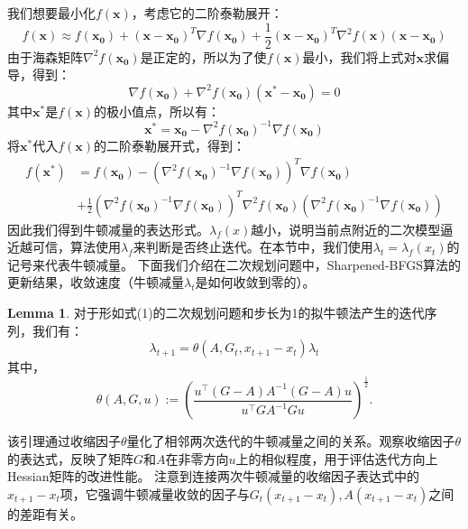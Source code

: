 \documentclass[a4paper,twoside,AutoFakeBold]{article}
\theoremstyle{definition}
\newtheorem{lema2}{{Lemma}}
\begin{document}
我们想要最小化$f(\bm{x})$，考虑它的二阶泰勒展开：
\begin{equation}
    f(\bm{x})\approx f(\bm{x_0})+(\bm{x}-\bm{x_0})^T\nabla f(\bm{x_0})+\frac{1}{2}(\bm{x}-\bm{x_0})^T\nabla^2 f(\bm{x})(\bm{x}-\bm{x_0})
\end{equation}
由于海森矩阵$\nabla^2 f(\bm{x_0})$是正定的，所以为了使$f(\bm{x})$最小，我们将上式对$\bm{x}$求偏导，得到：
\begin{equation}
        \nabla f(\bm{x_0})+\nabla ^2 f(\bm{x_0})(\bm{x^{*}}-\bm{x_0})=0
\end{equation}
其中$\bm{x^{*}}$是$f(\bm{x})$的极小值点，所以有：
\begin{equation}
    \bm{x^{*}}=\bm{x_0}-\nabla ^2 f(\bm{x_0})^{-1}\nabla f(\bm{x_0})
\end{equation}
将$\bm{x^{*}}$代入$f(\bm{x})$的二阶泰勒展开式，得到：
\begin{equation}
    \begin{aligned}
    f(\bm{x^{*}})&=f(\bm{x_0})-(\nabla^2f(\bm{x_0})^{-1}\nabla f(\bm{x_0}))^T\nabla f(\bm{x_0})\\
    &+\frac{1}{2}(\nabla^2f(\bm{x_0})^{-1}\nabla f(\bm{x_0}))^T\nabla^2f(\bm{x_0})(\nabla^2f(\bm{x_0})^{-1}\nabla f(\bm{x_0}))
    \end{aligned}
\end{equation}
因此我们得到牛顿减量的表达形式。$\lambda_f(x)$越小，说明当前点附近的二次模型逼近越可信，算法使用$\lambda_f$来判断是否终止迭代。在本节中，我们使用$\lambda_t=\lambda_f(x_t)$的记号来代表牛顿减量。
下面我们介绍在二次规划问题中，Sharpened-BFGS算法的更新结果，收敛速度（牛顿减量$\lambda_t$是如何收敛到零的）。

\begin{lema2}\label{lema:theone}
    对于形如式(1)的二次规划问题和步长为1的拟牛顿法产生的迭代序列，我们有：
    \begin{equation}
        \lambda_{t+1}=\theta(A,G_t,x_{t+1}-x_t)\lambda_t
    \end{equation}
    其中，
    \begin{equation}
        \theta(A,G,u) := \left(\frac{u^\top (G - A) A^{-1} (G - A) u}{u^\top G A^{-1} G u}\right)^{\frac{1}{2}}.
    \end{equation}
\end{lema2}

该引理通过收缩因子$\theta$量化了相邻两次迭代的牛顿减量之间的关系。观察收缩因子$\theta$的表达式，反映了矩阵$G$和$A$在非零方向$u$上的相似程度，用于评估迭代方向上Hessian矩阵的改进性能。
注意到连接两次牛顿减量的收缩因子表达式中的$x_{t+1}-x_t$项，它强调牛顿减量收敛的因子与$G_t(x_{t+1}-x_t),A(x_{t+1}-x_t)$之间的差距有关。
\end{document}
